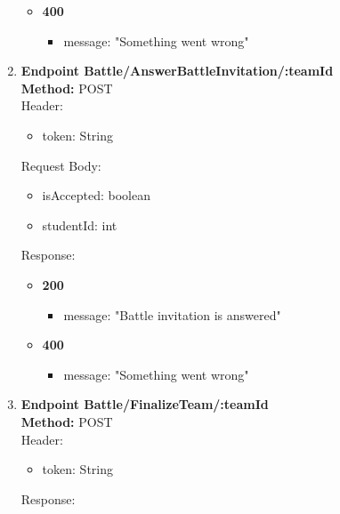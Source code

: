 \begin{enumerate}
\begin{itemize}
\begin{itemize}
        \end{itemize}
        \item \textbf{400} \\
        \begin{itemize}
            \item message: "Something went wrong"
        \end{itemize}
    \end{itemize}
    \item \textbf{Endpoint Battle/AnswerBattleInvitation/:teamId} \\
    \textbf{Method:} POST \\
    Header:\\
    \begin{itemize}
        \item token: String
    \end{itemize}
    Request Body:\\
    \begin{itemize}
        \item isAccepted: boolean
        \item studentId: int
    \end{itemize}
    Response:\\
    \begin{itemize}
        \item \textbf{200} \\
        \begin{itemize}
            \item message: "Battle invitation is answered"
        \end{itemize}
        \item \textbf{400} \\
        \begin{itemize}
            \item message: "Something went wrong"
        \end{itemize}
    \end{itemize}
    \item \textbf{Endpoint Battle/FinalizeTeam/:teamId} \\
    \textbf{Method:} POST \\
    Header:\\
    \begin{itemize}
        \item token: String
    \end{itemize}
    Response:\\
    \begin{itemize}

\end{itemize}
\end{enumerate}
